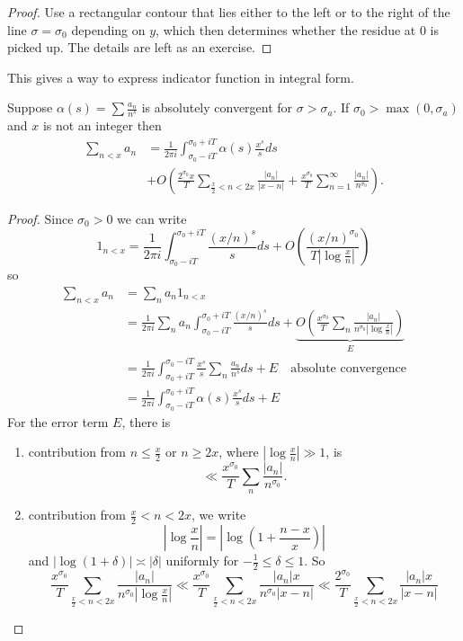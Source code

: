 \documentclass[a4paper]{article}
\theoremstyle{definition}
\begin{document}
\begin{proof}
  Use a rectangular contour that lies either to the left or to the right of the line \(\sigma = \sigma_0\) depending on \(y\), which then determines whether the residue at \(0\) is picked up. The details are left as an exercise.
\end{proof}
This gives a way to express indicator function in integral form.

\begin{theorem}
  Suppose \(\alpha(s) = \sum \frac{a_n}{n^s}\) is absolutely convergent for \(\sigma > \sigma_a\). If \(\sigma_0 > \max (0, \sigma_a)\) and \(x\) is not an integer then
  \begin{align*}
    \sum_{n < x} a_n
    &= \frac{1}{2 \pi i} \int_{\sigma_0 - iT}^{\sigma_0 + iT} \alpha(s) \frac{x^s}{s} ds \\
    &+ O(\frac{2^{\sigma_0}x}{T} \sum_{\frac{x}{2} < n < 2x} \frac{|a_n|}{|x - n|} + \frac{x^{\sigma_0}}{T} \sum_{n = 1}^\infty \frac{|a_n|}{n^{\sigma_0}}).
  \end{align*}
\end{theorem}

\begin{proof}
  Since \(\sigma_0 > 0\) we can write
  \[
    1_{n < x}
    = \frac{1}{2\pi i} \int_{\sigma_0 - iT}^{\sigma_0 + iT} \frac{(x/n)^s}{s} ds + O(\frac{(x/n)^{\sigma_0}}{T |\log \frac{x}{n}|})
  \]
  so
  \begin{align*}
    \sum_{n < x} a_n
    &= \sum_n a_n 1_{n < x} \\
    &= \frac{1}{2\pi i} \sum_n a_n \int_{\sigma_0 - iT}^{\sigma_0 + iT} \frac{(x/n)^s}{s} ds + \underbrace{O(\frac{x^{\sigma_0}}{T} \sum_n \frac{|a_n|}{n^{\sigma_0} |\log \frac{x}{n}|})}_E \\
    &= \frac{1}{2\pi i} \int_{\sigma_0 + iT}^{\sigma_0 - iT} \frac{x^s}{s} \sum_n \frac{a_n}{n^s} ds + E \quad \text{absolute convergence} \\
    &= \frac{1}{2 \pi i} \int_{\sigma_0 - iT}^{\sigma_0 + iT} \alpha(s) \frac{x^s}{s} ds + E
  \end{align*}
  For the error term \(E\), there is
  \begin{enumerate}
  \item contribution from \(n \leq \frac{x}{2}\) or \(n \geq 2x\), where \(|\log \frac{x}{n}| \gg 1\), is
    \[
      \ll \frac{x^{\sigma_0}}{T} \sum_n \frac{|a_n|}{n^{\sigma_0}}.
    \]
  \item contribution from \(\frac{x}{2} < n < 2x\), we write
    \[
      |\log \frac{x}{n}| = |\log (1 + \frac{n - x}{x})|
    \]
    and \(|\log (1 + \delta)| \asymp |\delta|\) uniformly for \(- \frac{1}{2} \leq \delta \leq 1\). So
    \[
      \frac{x^{\sigma_0}}{T} \sum_{\frac{x}{2} < n < 2x} \frac{|a_n|}{n^{\sigma_0} |\log \frac{x}{n}|}
      \ll \frac{x^{\sigma_0}}{T} \sum_{\frac{x}{2} < n < 2x} \frac{|a_n| x}{n^{\sigma_0} |x - n|}
      \ll \frac{2^{\sigma_0}}{T} \sum_{\frac{x}{2} < n < 2x} \frac{|a_n| x}{|x - n|}
    \]
  \end{enumerate}
\end{proof}
\end{document}
